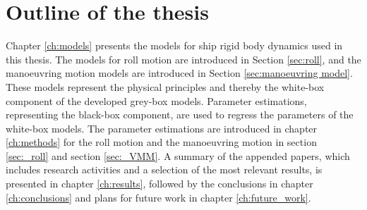 \section{Outline of the thesis}
Chapter \ref{ch:models} presents the models for ship rigid body dynamics used in this thesis. The models for roll motion are introduced in Section \ref{sec:roll}, and the manoeuvring motion models are introduced in Section \ref{sec:manoeuvring model}. These models represent the physical principles and thereby the white-box component of the developed grey-box models.
Parameter estimations, representing the black-box component, are used to regress the parameters of the white-box models. The parameter estimations are introduced in chapter \ref{ch:methods} for the roll motion and the manoeuvring motion in section \ref{sec:_roll} and section \ref{sec:_VMM}. 
A summary of the appended papers, which includes research activities and a selection of the most relevant results, is presented in chapter \ref{ch:results}, followed by the conclusions in chapter \ref{ch:conclusions} and plans for future work in chapter \ref{ch:future_work}.